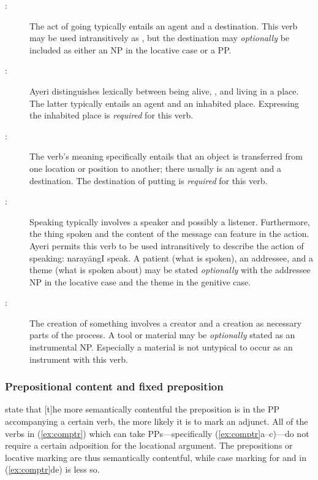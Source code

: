 \begin{description}
	\item[:] The act of going typically entails an
	agent and a destination. This verb may be used intransitively as
	, but the destination may \emph{optionally}
	be included as either an NP in the locative case or a PP.

	\item[:] Ayeri distinguishes
	lexically between being alive, , and living in a place.
	The latter typically entails an agent and an inhabited place. Expressing
	the inhabited place is \emph{required} for this verb.

	\item[:] The verb's meaning specifically
	entails that an object is transferred from one location or position to
	another; there usually is an agent and a destination. The destination of
	putting is \emph{required} for this verb.

	\item[:] Speaking typically involves
	a speaker and possibly a listener. Furthermore, the thing spoken and the
	content of the message can feature in the action. Ayeri permits this verb
	to be used intransitively to describe the action of speaking:
	 {narayāng}{I speak}. A patient (what is spoken), an
	addressee, and a theme (what is spoken about) may be stated
	\emph{optionally} with the addressee NP in the locative case and the theme
	in the genitive case.

	\item[:] The creation of something involves
	a creator and a creation as necessary parts of the process. A tool or
	material may be \emph{optionally} stated as an instrumental NP. Especially
	a material is not untypical to occur as an instrument with this verb.
\end{description}

\subsubsection{Prepositional content and fixed preposition}

\citet{needhamtoivonen2011} state that 
{[t]he more semantically contentful the preposition is in the PP accompanying a
certain verb, the more likely it is to mark an adjunct}. All of the verbs in
(\ref{ex:comptr}) which can take PPs---specifically (\ref{ex:comptr}a--c)---do
not require a certain adposition for the locational argument. The prepositions
or locative marking are thus semantically contentful, while case marking for
 and  in (\ref{ex:comptr}de) is
less so.


